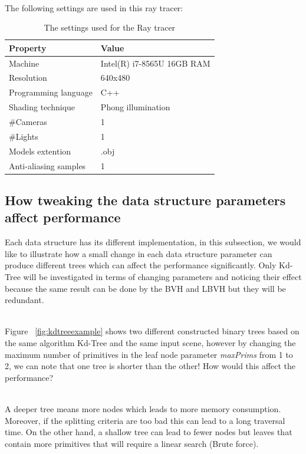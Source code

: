 \documentclass[11pt,a4paper]{article}
\begin{document}
\noindent
\\
The following settings are used in this ray tracer:

\newcommand\T{\rule{0pt}{2.6ex}}       %
\newcommand\B{\rule[-1.2ex]{0pt}{0pt}} %

\begin{table}[H] 
\centering 
{\footnotesize
\begin{tabular}{ P{7cm} P{7cm} }      %
\hline \hline
Property & Value \T\B  \\
\hline \hline
Machine & Intel(R) i7-8565U 16GB RAM\T\B
\\    
\hline
Resolution & 640x480  \T\B
\\
 \hline
Programming language & C++  \T\B 
\\ 
 \hline
Shading technique & Phong illumination \T\B 
\\
 \hline
\#Cameras & 1 \T\B 
\\
\#Lights & 1  \T\B 
\\ 
 \hline
 Models extention& .obj \T\B 
\\ 
 \hline
Anti-aliasing samples & 1 \T\B 
\\ 
\hline \hline
    \end{tabular}
}
  \caption{The settings used for the Ray tracer}
\end{table}

\subsection{How tweaking the data structure parameters affect performance}
Each data structure has its different implementation, in this subsection, we would like to illustrate how a small change in each data structure parameter can produce different trees which can affect the performance significantly. Only Kd-Tree will be investigated in terms of changing parameters and noticing their effect because the same result can be done by the BVH and LBVH but they will be redundant.

\noindent
\\
Figure ~\ref{fig:kdtreeexample} shows two different constructed binary trees based on the same algorithm Kd-Tree and the same input scene, however by changing the maximum number of primitives in the leaf node parameter \textit{maxPrims} from 1 to 2, we can note that one tree is shorter than the other! How would this affect the performance? 

\noindent
\\
A deeper tree means more nodes which leads to more memory consumption. Moreover, if the splitting criteria are too bad this can lead to a long traversal time. On the other hand, a shallow tree can lead to fewer nodes but leaves that contain more primitives that will require a linear search (Brute force). 
\end{document}
